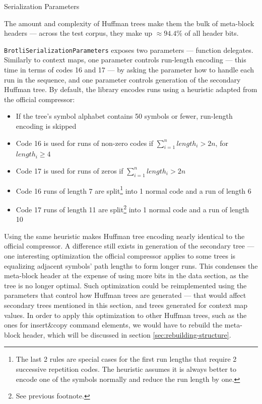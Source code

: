 \documentclass[english,master,dept460,male,cpp,cpdeclaration]{diploma}
\makeatletter
\renewcommand\paragraph
	{\@startsection{paragraph}{4}{\z@}
	{-3.25ex plus 1ex minus .2ex}
	{1.5ex plus .2ex}
	{\normalfont\normalsize\bfseries}}
\newcommand{\subfoursection}[1]{\paragraph{#1}}
\newcommand{\nosep}{\itemsep0em}
\makeatother
\begin{document}
			\subfoursection{Serialization Parameters}
			
			The amount and complexity of Huffman trees make them the bulk of meta-block headers --- across the test corpus, they make up $\approx 94.4 \%$ of all header bits.
			
			\verb|BrotliSerializationParameters| exposes two parameters --- function delegates. Similarly to context maps, one parameter controls run-length encoding --- this time in terms of codes 16 and 17 --- by asking the parameter how to handle each run in the sequence, and one parameter controls generation of the secondary Huffman tree. By default, the library encodes runs using a heuristic adapted from the official compressor:
			
			\begin{itemize} \nosep
				\item If the tree's symbol alphabet contains 50 symbols or fewer, run-length encoding is skipped
				\item Code 16 is used for runs of non-zero codes if $\sum_{i=1}^n{length_i} > 2n$, for $length_i \geq 4$
				\item Code 17 is used for runs of zeros if $\sum_{i=1}^n{length_i} > 2n$
				\item Code 16 runs of length 7 are split\footnote{The last 2 rules are special cases for the first run lengths that require 2 successive repetition codes. The heuristic assumes it is always better to encode one of the symbols normally and reduce the run length by one.} into 1 normal code and a run of length 6
				\item Code 17 runs of length 11 are split\footnote{See previous footnote.} into 1 normal code and a run of length 10
			\end{itemize}
			
			\noindent
			Using the same heuristic makes Huffman tree encoding nearly identical to the official compressor. A difference still exists in generation of the secondary tree --- one interesting optimization the official compressor applies to some trees is equalizing adjacent symbols' path lengths to form longer runs. This condenses the meta-block header at the expense of using more bits in the data section, as the tree is no longer optimal. Such optimization could be reimplemented using the parameters that control how Huffman trees are generated --- that would affect secondary trees mentioned in this section, and trees generated for context map values. In order to apply this optimization to other Huffman trees, such as the ones for insert\&copy command elements, we would have to rebuild the meta-block header, which will be discussed in section \ref{sec:rebuilding-structure}.
			
\end{document}
